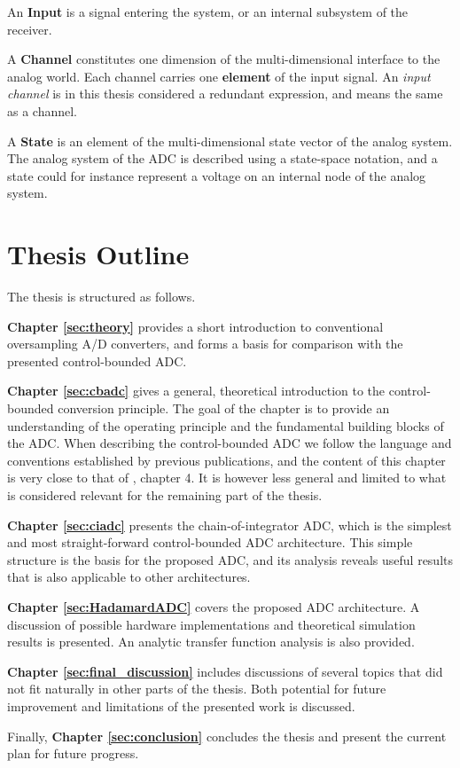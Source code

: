 An \textbf{Input} is a signal entering the system, or an internal subsystem of the receiver.

A \textbf{Channel} constitutes one dimension of the multi-dimensional interface to the analog world. Each channel carries one \textbf{element} of the input signal. An \textit{input channel} is in this thesis considered a redundant expression, and means the same as a channel.

A \textbf{State} is an element of the multi-dimensional state vector of the analog system. The analog system of the ADC is described using a state-space notation, and a state could for instance represent a voltage on an internal node of the analog system.






\section{Thesis Outline}
The thesis is structured as follows.

\textbf{Chapter \ref{sec:theory}} provides a short introduction to conventional oversampling A/D converters, and forms a basis for comparison with the presented control-bounded ADC.

\textbf{Chapter \ref{sec:cbadc}} gives a general, theoretical introduction to the control-bounded conversion principle. The goal of the chapter is to provide an understanding of the operating principle and the fundamental building blocks of the ADC. When describing the control-bounded ADC we follow the language and conventions established by previous publications, and the content of this chapter is very close to that of \cite{malmberg_thesis}, chapter 4. It is however less general and limited to what is considered relevant for the remaining part of the thesis.

\textbf{Chapter \ref{sec:ciadc}} presents the chain-of-integrator ADC, which is the simplest and most straight-forward control-bounded ADC architecture. This simple structure is the basis for the proposed ADC, and its analysis reveals useful results that is also applicable to other architectures.

\textbf{Chapter \ref{sec:HadamardADC}} covers the proposed ADC architecture. A discussion of possible hardware implementations and theoretical simulation results is presented. An analytic transfer function analysis is also provided.

\textbf{Chapter \ref{sec:final_discussion}} includes discussions of several topics that did not fit naturally in other parts of the thesis. Both potential for future improvement and limitations of the presented work is discussed.

Finally, \textbf{Chapter \ref{sec:conclusion}} concludes the thesis and present the current plan for future progress.

